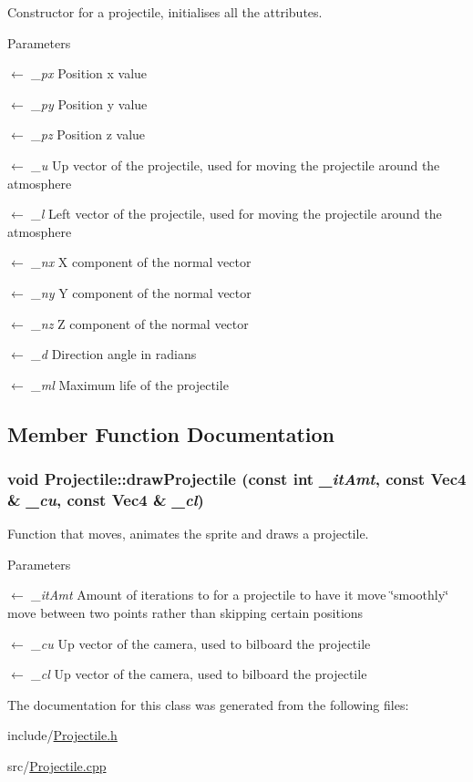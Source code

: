 Constructor for a projectile, initialises all the attributes. 
\begin{DoxyParams}{Parameters}
\item[\mbox{$\leftarrow$} {\em \_\-px}]Position x value \item[\mbox{$\leftarrow$} {\em \_\-py}]Position y value \item[\mbox{$\leftarrow$} {\em \_\-pz}]Position z value \item[\mbox{$\leftarrow$} {\em \_\-u}]Up vector of the projectile, used for moving the projectile around the atmosphere \item[\mbox{$\leftarrow$} {\em \_\-l}]Left vector of the projectile, used for moving the projectile around the atmosphere \item[\mbox{$\leftarrow$} {\em \_\-nx}]X component of the normal vector \item[\mbox{$\leftarrow$} {\em \_\-ny}]Y component of the normal vector \item[\mbox{$\leftarrow$} {\em \_\-nz}]Z component of the normal vector \item[\mbox{$\leftarrow$} {\em \_\-d}]Direction angle in radians \item[\mbox{$\leftarrow$} {\em \_\-ml}]Maximum life of the projectile \end{DoxyParams}


\subsection{Member Function Documentation}
\hypertarget{classProjectile_af4bc39a4bae46e9bbd532a659be199ef}{
\subsubsection[{drawProjectile}]{\setlength{\rightskip}{0pt plus 5cm}void Projectile::drawProjectile (const int {\em \_\-itAmt}, \/  const {\bf Vec4} \& {\em \_\-cu}, \/  const {\bf Vec4} \& {\em \_\-cl})}}
\label{classProjectile_af4bc39a4bae46e9bbd532a659be199ef}


Function that moves, animates the sprite and draws a projectile. 
\begin{DoxyParams}{Parameters}
\item[\mbox{$\leftarrow$} {\em \_\-itAmt}]Amount of iterations to for a projectile to have it move \char`\"{}smoothly\char`\"{} move between two points rather than skipping certain positions \item[\mbox{$\leftarrow$} {\em \_\-cu}]Up vector of the camera, used to bilboard the projectile \item[\mbox{$\leftarrow$} {\em \_\-cl}]Up vector of the camera, used to bilboard the projectile \end{DoxyParams}


The documentation for this class was generated from the following files:\begin{DoxyCompactItemize}
\item 
include/\hyperlink{Projectile_8h}{Projectile.h}\item 
src/\hyperlink{Projectile_8cpp}{Projectile.cpp}\end{DoxyCompactItemize}
